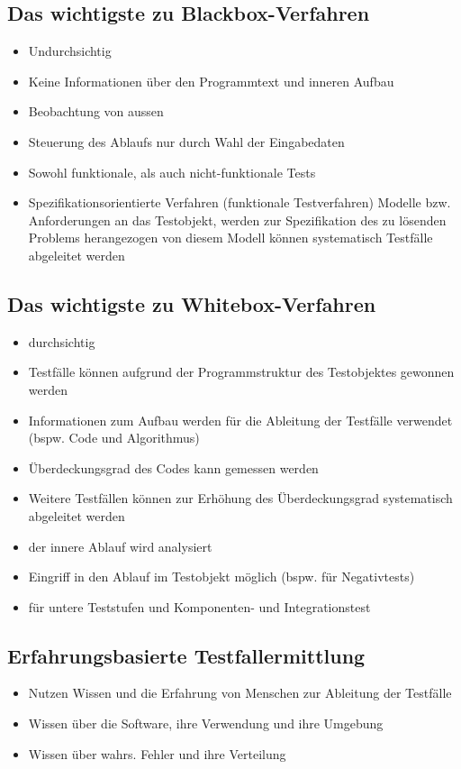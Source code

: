 \documentclass{report}
\theoremstyle{definition}
\theoremstyle{example}
\begin{document}
\subsection{Das wichtigste zu Blackbox-Verfahren}
\begin{itemize}
   \item Undurchsichtig
   \item Keine Informationen über den Programmtext und inneren Aufbau
   \item Beobachtung von aussen
   \item Steuerung des Ablaufs nur durch Wahl der Eingabedaten
   \item Sowohl funktionale, als auch nicht-funktionale Tests
   \item Spezifikationsorientierte Verfahren (funktionale Testverfahren)
   \subitem Modelle bzw. Anforderungen an das Testobjekt, werden zur Spezifikation des zu lösenden Problems herangezogen
   \subitem von diesem Modell können systematisch Testfälle abgeleitet werden 
\end{itemize}

\subsection{Das wichtigste zu Whitebox-Verfahren}
\begin{itemize}
   \item durchsichtig
   \item Testfälle können aufgrund der Programmstruktur des Testobjektes gewonnen werden
   \item Informationen zum Aufbau werden für die Ableitung der Testfälle verwendet (bspw. Code und Algorithmus)
   \item Überdeckungsgrad des Codes kann gemessen werden
   \item Weitere Testfällen können zur Erhöhung des Überdeckungsgrad systematisch abgeleitet werden
   \item der innere Ablauf wird analysiert
   \item Eingriff in den Ablauf im Testobjekt möglich (bspw. für Negativtests)
   \item für untere Teststufen und Komponenten- und Integrationstest
\end{itemize}

\subsection{Erfahrungsbasierte Testfallermittlung}
\begin{itemize}
   \item Nutzen Wissen und die Erfahrung von Menschen zur Ableitung der Testfälle
   \item Wissen über die Software, ihre Verwendung und ihre Umgebung
   \item Wissen über wahrs. Fehler und ihre Verteilung
\end{itemize}
\end{document}
